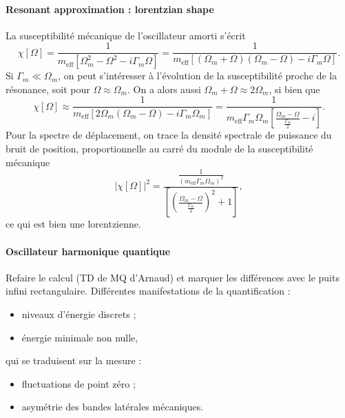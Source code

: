 \documentclass[12pt,a4paper]{article}
\begin{document}
\paragraph{Resonant approximation : lorentzian shape\\}
La susceptibilité mécanique de l'oscillateur amorti s'écrit
\begin{equation}
\chi[\Omega] = \frac{1}{m_\mathrm{eff}\left[\Omega_m^2-\Omega^2 - i\Gamma_m\Omega\right]} = \frac{1}{m_\mathrm{eff}\left[(\Omega_m+\Omega)(\Omega_m-\Omega) - i\Gamma_m\Omega\right]}.
\end{equation}
Si $\Gamma_m \ll \Omega_m$, on peut s'intéresser à l'évolution de la susceptibilité proche de la résonance, soit pour $\Omega \approx \Omega_m$.
On a alors aussi $\Omega_m+\Omega \approx 2\Omega_m$, si bien que
\begin{equation}
\chi[\Omega] \approx \frac{1}{m_\mathrm{eff}\left[2\Omega_m(\Omega_m-\Omega) - i\Gamma_m\Omega_m\right]} = \frac{1}{m_\mathrm{eff}\Gamma_m\Omega_m\left[\frac{\Omega_m-\Omega}{\frac{\Gamma_m}{2}} - i\right]}.
\end{equation}
Pour la spectre de déplacement, on trace la densité spectrale de puissance du bruit de position, proportionnelle au carré du module de la susceptibilité mécanique
\begin{equation}
\left|\chi[\Omega]\right|^2 = \frac{\frac{1}{(m_\mathrm{eff}\Gamma_m\Omega_m)^2}}{\left[\left(\frac{\Omega_m-\Omega}{\frac{\Gamma_m}{2}}\right)^2 + 1\right]},
\end{equation}
ce qui est bien une lorentzienne.

\paragraph{Oscillateur harmonique quantique\\}
Refaire le calcul (TD de MQ d'Arnaud) et marquer les différences avec le puits infini rectangulaire.
Différentes manifestations de la quantification :
\begin{itemize}
\item niveaux d'énergie discrets ;
\item énergie minimale non nulle,
\end{itemize}
qui se traduisent sur la mesure :
\begin{itemize}
\item fluctuations de point zéro ;
\item asymétrie des bandes latérales mécaniques.
\end{itemize}
\end{document}
